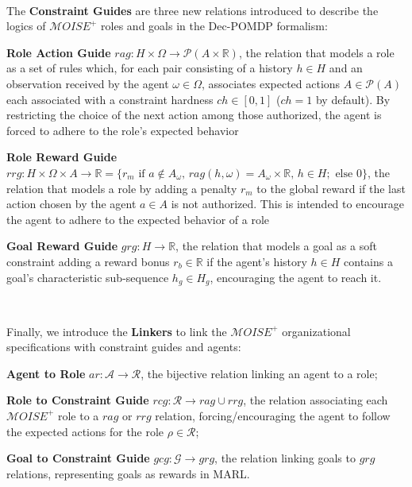 \documentclass[pdflatex,sn-mathphys-num]{sn-jnl}%
\theoremstyle{thmstyleone}%
\theoremstyle{thmstyletwo}%
\theoremstyle{thmstylethree}%
\begin{document}
\

\noindent The \textbf{Constraint Guides} are three new relations introduced to describe the logics of $\mathcal{M}OISE^+$ roles and goals in the Dec-POMDP formalism:
%
\begin{enumerate*}[label={\roman*) },itemjoin={; \quad}]
    
    \item \textbf{Role Action Guide} \quad $rag: H \times \Omega \rightarrow \mathcal{P}(A \times \mathbb{R})$, the relation that models a role as a set of rules which, for each pair consisting of a history $h \in H$ and an observation received by the agent $\omega \in \Omega$, associates expected actions $A \in \mathcal{P}(A)$ each associated with a constraint hardness $ch \in [0,1]$ ($ch = 1$ by default). By restricting the choice of the next action among those authorized, the agent is forced to adhere to the role's expected behavior
    \item \textbf{Role Reward Guide} \quad $rrg: H \times \Omega \times A \to \mathbb{R} = \{r_m \text{ if } a \notin A_\omega \text{, } rag(h, \omega) \allowbreak = \allowbreak A_\omega \times \mathbb{R} \text{, } h \in H; \text{ else } 0\}$, the relation that models a role by adding a penalty $r_m$ to the global reward if the last action chosen by the agent $a \in A$ is not authorized. This is intended to encourage the agent to adhere to the expected behavior of a role
    \item \textbf{Goal Reward Guide} \quad $grg: H \rightarrow \mathbb{R}$, the relation that models a goal as a soft constraint adding a reward bonus $r_b \in \mathbb{R}$ if the agent's history $h \in H$ contains a goal's characteristic sub-sequence $h_g \in H_g$, encouraging the agent to reach it.
\end{enumerate*}

\

\noindent Finally, we introduce the \textbf{Linkers} to link the $\mathcal{M}OISE^+$ organizational specifications with constraint guides and agents:
%
\begin{enumerate*}[label={\roman*) },itemjoin={; \quad}]
    
    \item \textbf{Agent to Role} \quad $ar: \mathcal{A} \to \mathcal{R}$, the bijective relation linking an agent to a role;
    \item \textbf{Role to Constraint Guide} \quad $rcg: \mathcal{R} \rightarrow rag \cup rrg$, the relation associating each $\mathcal{M}OISE^+$ role to a $rag$ or $rrg$ relation, forcing/encouraging the agent to follow the expected actions for the role $\rho \in \mathcal{R}$;
    \item \textbf{Goal to Constraint Guide} \quad $gcg: \mathcal{G} \rightarrow grg$, the relation linking goals to $grg$ relations, representing goals as rewards in MARL.
\end{enumerate*}
\end{document}
